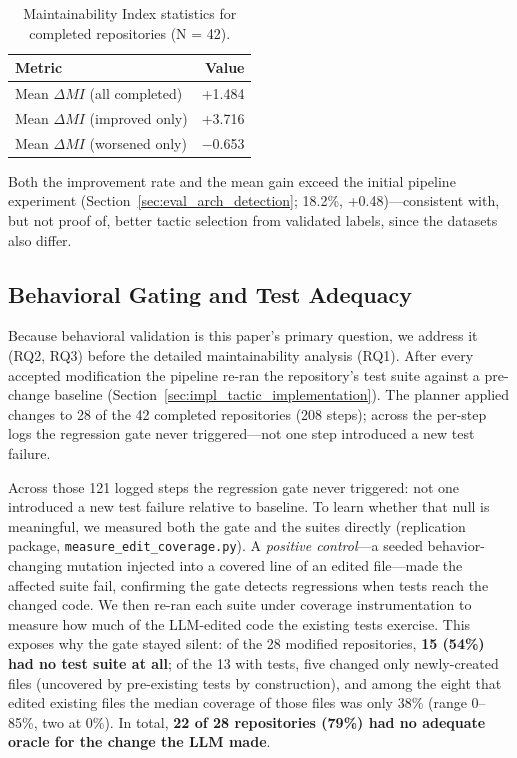 \documentclass[runningheads]{llncs}
\begin{document}
\begin{table}[H]
\centering
\small
\caption{Maintainability Index statistics for completed repositories (N = 42).}
\label{tab:exp5_mi}
\begin{tabular}{lr}
\toprule
\textbf{Metric} & \textbf{Value} \\
\midrule
Mean $\Delta MI$ (all completed)  & +1.484 \\
Mean $\Delta MI$ (improved only)  & +3.716 \\
Mean $\Delta MI$ (worsened only)  & $-$0.653 \\
\bottomrule
\end{tabular}
\end{table}

Both the improvement rate and the mean gain exceed the initial pipeline experiment (Section~\ref{sec:eval_arch_detection}; 18.2\%, +0.48)---consistent with, but not proof of, better tactic selection from validated labels, since the datasets also differ.

\subsection{Behavioral Gating and Test Adequacy}
\label{subsec:exp5_testing}

Because behavioral validation is this paper's primary question, we address it (RQ2, RQ3) before the detailed maintainability analysis (RQ1). After every accepted modification the pipeline re-ran the repository's test suite against a pre-change baseline (Section~\ref{sec:impl_tactic_implementation}). The planner applied changes to 28 of the 42 completed repositories (208 steps); across the per-step logs the regression gate never triggered---not one step introduced a new test failure.

Across those 121 logged steps the regression gate never triggered: not one introduced a new test failure relative to baseline. To learn whether that null is meaningful, we measured both the gate and the suites directly (replication package, \texttt{measure\_edit\_coverage.py}). A \emph{positive control}---a seeded behavior-changing mutation injected into a covered line of an edited file---made the affected suite fail, confirming the gate detects regressions when tests reach the changed code. We then re-ran each suite under coverage instrumentation to measure how much of the LLM-edited code the existing tests exercise. This exposes why the gate stayed silent: of the 28 modified repositories, \textbf{15 (54\%) had no test suite at all}; of the 13 with tests, five changed only newly-created files (uncovered by pre-existing tests by construction), and among the eight that edited existing files the median coverage of those files was only 38\% (range 0--85\%, two at 0\%). In total, \textbf{22 of 28 repositories (79\%) had no adequate oracle for the change the LLM made}.
\end{document}
